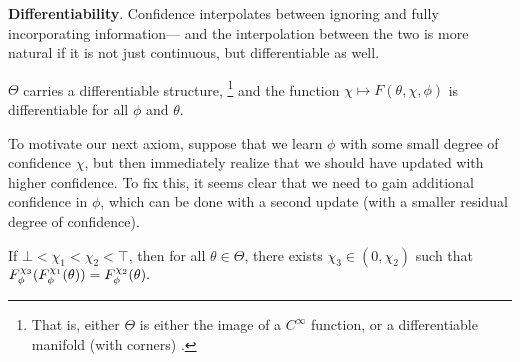 \textbf{Differentiability}.
Confidence interpolates between ignoring and fully incorporating information---
and the interpolation between the two is more natural if it is not just 
continuous, but differentiable as well.

\begin{CFaxioms}
	\item \label{ax:diffble}
	$\Theta$
	carries a differentiable structure,
	\unskip\footnote{
		That is, either 
		$\Theta$ is either the image of a $C^\infty$ function,
	 	or a differentiable manifold (with corners) 
		\parencite{lee2013smooth,joyce2009manifolds-w/corners}.}
	and  
	the function $\chi \mapsto F(\theta,\chi,\phi)$
	is differentiable
	for all $\phi$ and $\theta$.
\end{CFaxioms}

To motivate our next axiom,
suppose that we learn $\phi$ with some small degree of confidence $\chi$,
but then immediately realize that we should have updated with higher confidence. 
To fix this, it seems clear that we need to gain additional confidence
in $\phi$, which can be done with a second update 
(with a smaller residual degree of confidence).

\begin{CFaxioms}
	\item 
	If $\bot < \chi_1 < \chi_2 < \top$, 
	then for all $\theta \in \Theta$, 
	there exists 
	$\chi_3 \in (0,\chi_2)$
	such that
	$
	F_\phi^{
	\chi_{3}
	}(F_\phi^{\chi_1}(\theta)) = F_\phi^{\chi_2}(\theta).
	$
	\label{ax:seq-for-more}
\end{CFaxioms}

